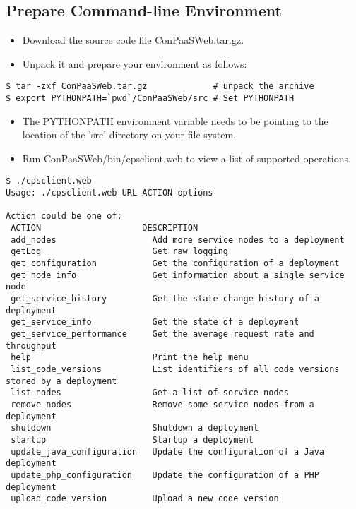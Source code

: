 \documentclass[12pt]{article}
\newenvironment{framedbox}[1]%
{\begin{framed}
 \begingroup
 \fontsize{#1}{#1}\selectfont
}
{
 \endgroup
 \end{framed}
}
\begin{document}
\subsection{Prepare Command-line Environment}
\begin{itemize}
\item Download the source code file ConPaaSWeb.tar.gz.
\item Unpack it and prepare your environment as follows:
\end{itemize}
\begin{framedbox}{12pt}\begin{verbatim}
$ tar -zxf ConPaaSWeb.tar.gz             # unpack the archive
$ export PYTHONPATH=`pwd`/ConPaaSWeb/src # Set PYTHONPATH
\end{verbatim}\end{framedbox}
\begin{itemize}
\item The PYTHONPATH environment variable needs to be pointing to the
      location of the 'src' directory on your file system.
\item Run ConPaaSWeb/bin/cpsclient.web to view a list of supported
      operations.
\end{itemize}
\begin{framedbox}{8pt}\begin{verbatim}
$ ./cpsclient.web
Usage: ./cpsclient.web URL ACTION options

Action could be one of:
 ACTION                    DESCRIPTION
 add_nodes                   Add more service nodes to a deployment
 getLog                      Get raw logging
 get_configuration           Get the configuration of a deployment
 get_node_info               Get information about a single service node
 get_service_history         Get the state change history of a deployment
 get_service_info            Get the state of a deployment
 get_service_performance     Get the average request rate and throughput
 help                        Print the help menu
 list_code_versions          List identifiers of all code versions stored by a deployment
 list_nodes                  Get a list of service nodes
 remove_nodes                Remove some service nodes from a deployment
 shutdown                    Shutdown a deployment
 startup                     Startup a deployment
 update_java_configuration   Update the configuration of a Java deployment
 update_php_configuration    Update the configuration of a PHP deployment
 upload_code_version         Upload a new code version
\end{verbatim}\end{framedbox}
\end{document}
